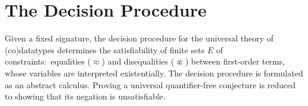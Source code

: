 \documentclass[letter]{article}
\newcommand\MU{\vvthinspace\mu\vvthinspace}
\theoremstyle{plain}
\theoremstyle{definition}
\newcommand\afterDot{\;} %
\newcommand\Sig{\mathrm{\Sigma}}
\newcommand\keyw[1]{\textbf{#1}}
\newcommand\const[1]{\textsf{#1}}
\newcommand\ty[1]{\textit{#1}}
\newcommand{\Ec}{E}
\newcommand{\teq}{\approx}
\newcommand{\JJJJ}{\mathcal{\!J\!}}
\newcommand{\thD}{\mathcalx{DC}}
\newcommand\vvthinspace{\kern+0.041667em}
\newcommand\vthinspace{\kern+0.083333em}
\begin{document}
%
%

\section{The Decision Procedure} %
\label{sec:the-decision-procedure}

Given a fixed signature, %
the decision procedure for the universal theory of (co)data\-types %
determines the
satisfiability of finite sets $\Ec$ of constraints:\ equalities ($\teq$)
and disequalities ($\not\teq$) between first-order terms, %
whose variables are interpreted existentially.
The decision procedure is formulated as an %
abstract calculus.
Proving a universal quantifier-free conjecture is reduced to showing that
its negation is unsatisfiable. 
\end{document}
